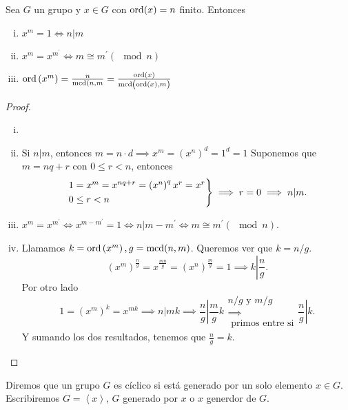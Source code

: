 \begin{lema}
    Sea $G$ un grupo y $x \in G$ con $\operatorname{ord}(x) = n$ finito. Entonces
    \begin{enumerate}[i)]
        \item $x^m = 1 \iff n \vert m$
        \item $x^m = x^{m^\prime} \iff m \cong m^\prime (\mod n)$
        \item $\operatorname{ord}\left( x^m \right) = \frac{n}{\operatorname{mcd}(n, m} = \frac{\operatorname{ord}(x)}{\operatorname{mcd}\left( \operatorname{ord}(x), m \right)}$
    \end{enumerate}
\end{lema}

\begin{proof}
    \begin{enumerate}[i)]
        \item[]
        \item Si $n \vert m$, entonces $m = n \cdot d \implies x^m = \left( x^n \right)^d = 1^d = 1$
            Suponemos que $m = nq + r$ con $0 \leq r < n$, entonces
            \[
                \begin{rcases}
                    1 = x^m = x^{nq + r} = \left( x^n \right)^q x^r = x^r \\
                    0 \leq r < n
                \end{rcases}
                \implies r = 0 \implies n \vert m.
            \]
        \item $x^m = x^{m^\prime} \iff x^{m - m^\prime} = 1 \iff n \vert m - m^\prime \iff
            m \cong m^\prime (\mod n)$.
        \item Llamamos $k = \operatorname{ord}\left( x^m \right), g = \operatorname{mcd}(n, m)$. Queremos ver que $k = n/g$.
            \[
                \left( x^m \right)^{\frac{n}{g}} = x^{\frac{mn}{g}} = \left( x^n \right)^{\frac{m}{g}} = 1
                \implies k \left\vert \frac{n}{g} \right. .
            \]
            Por otro lado
            \[
                1 = \left( x^m \right)^k = x^{mk} \implies n \vert mk \implies \left.\frac{n}{g} \right\vert \frac{m}{g} k
                \substack{n/g \text{ y } m/g \\ \implies \\ \text{ primos entre si}} \left.\frac{n}{g} \right\vert k.
            \]
            Y sumando los dos resultados, tenemos que $\frac{n}{g} = k$.
    \end{enumerate}
\end{proof}

\begin{defi}
    Diremos que un grupo $G$ es cíclico si está generado por un solo elemento $x \in G$.
    Escribiremos $G = \left< x \right>$, $G$ generado por $x$ o $x$ generdor de $G$.
\end{defi}

